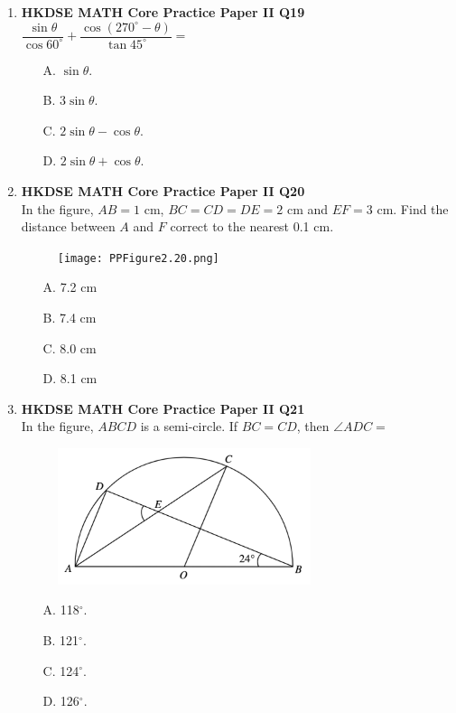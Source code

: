 \documentclass[12pt]{article}
\begin{document}
\begin{enumerate}
	\item \textbf{HKDSE MATH Core Practice Paper II Q19}\\
	$\dfrac{\sin{\theta}}{\cos{60^\circ}} + \dfrac{\cos{(270^\circ - \theta)}}{\tan{45^\circ}} = $ 
	\begin{enumerate}
		\item[A.] $\sin{\theta}$.
		\item[B.] $3\sin{\theta}$.
		\item[C.] $2\sin{\theta} - \cos{\theta}$.
		\item[D.] $2\sin{\theta} + \cos{\theta}$.
	\end{enumerate}

	\item \textbf{HKDSE MATH Core Practice Paper II Q20}\\
	In the figure, $AB = 1$ cm, $BC = CD = DE = 2$ cm and $EF = 3$ cm. Find the distance between $A$ and $F$ correct to the nearest 0.1 cm.
	\begin{figure}[H]
		\centering
		\texttt{[image: PPFigure2.20.png]}	
	\end{figure}
	\begin{enumerate}
		\item[A.] 7.2 cm
		\item[B.] 7.4 cm
		\item[C.] 8.0 cm
		\item[D.] 8.1 cm
	\end{enumerate}

	\item \textbf{HKDSE MATH Core Practice Paper II Q21}\\
	In the figure, $ABCD$ is a semi-circle. If $BC = CD$, then $\angle ADC = $
	\begin{figure}[H]
		\centering
		\includegraphics[width = 0.7\textwidth]{PPFigure2.21.png}	
	\end{figure}
	\begin{enumerate}
		\item[A.] 118$^\circ$.
		\item[B.] 121$^\circ$.
		\item[C.] 124$^\circ$.
		\item[D.] 126$^\circ$.
	\end{enumerate}


\end{enumerate}
\end{document}
